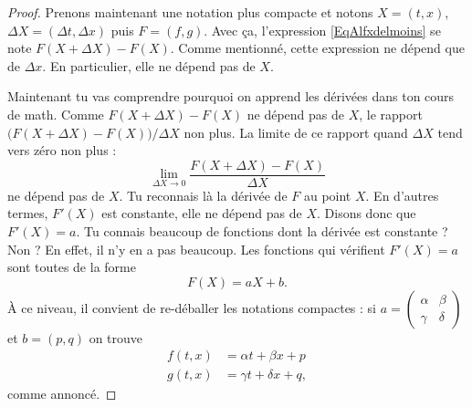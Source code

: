 \begin{proof}
	Prenons maintenant une notation plus compacte et notons \( X=(t,x)\), \( \Delta X=(\Delta t,\Delta x)\) puis \( F=(f,g)\). Avec ça, l'expression \eqref{EqAlfxdelmoins} se note \( F(X+\Delta X)-F(X)\). Comme mentionné, cette expression ne dépend que de \( \Delta x\). En particulier, elle ne dépend pas de \( X\).

	Maintenant tu vas comprendre pourquoi on apprend les dérivées dans ton cours de math. Comme \( F(X+\Delta X)-F(X)\) ne dépend pas de \( X\), le rapport \( \big( F(X+\Delta X)-F(X) \big)/\Delta X\) non plus. La limite de ce rapport quand \( \Delta X\) tend vers zéro non plus :
	\begin{equation}
		\lim_{\Delta X\to 0}\frac{ F(X+\Delta X)-F(X) }{ \Delta X }
	\end{equation}
	ne dépend pas de \( X\). Tu reconnais là la dérivée de \( F\) au point \( X\). En d'autres termes, \( F'(X)\) est constante, elle ne dépend pas de \( X\). Disons donc que \( F'(X)=a\). Tu connais beaucoup de fonctions dont la dérivée est constante ? Non ? En effet, il n'y en a pas beaucoup. Les fonctions qui vérifient \( F'(X)=a\) sont toutes de la forme
	\[
		F(X)=aX+b.
	\]
	À ce niveau, il convient de re-déballer les notations compactes : si \( a=\begin{pmatrix}
		\alpha & \beta \\\gamma&\delta
	\end{pmatrix}\) et \( b=(p,q)\) on trouve
	\begin{subequations}		\label{EqLoUn}
		\begin{align}
			f(t,x) & =\alpha t+\beta x+p   \\
			g(t,x) & =\gamma t+\delta x+q,
		\end{align}
	\end{subequations}
	comme annoncé.

\end{proof}


